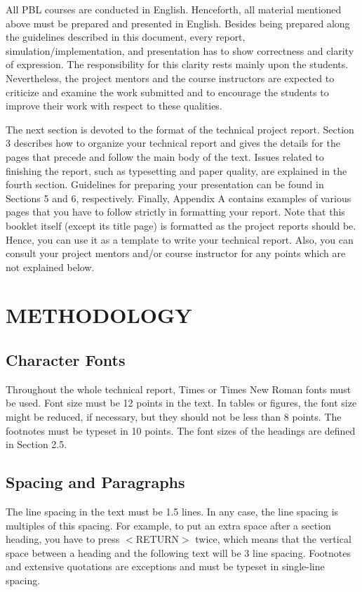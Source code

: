 \documentclass[12pt]{article} %
\numberwithin{equation}{section}
\numberwithin{figure}{section}
\numberwithin{table}{section}
\numberwithin{algorithm}{section}
\begin{document}
All PBL courses are conducted in English. Henceforth, all material mentioned above must be prepared and presented in English. Besides being prepared along the guidelines described in this document, every report, simulation/implementation, and presentation has to show correctness and clarity of expression. The responsibility for this clarity rests mainly upon the students. Nevertheless, the project mentors and the course instructors are expected to criticize and examine the work submitted and to encourage the students to improve their work with respect to these qualities.

The next section is devoted to the format of the technical project report. Section 3 describes how to organize your technical report and gives the details for the pages that precede and follow the main body of the text. Issues related to finishing the report, such as typesetting and paper quality, are explained in the fourth section. Guidelines for preparing your presentation can be found in Sections 5 and 6, respectively. Finally, Appendix A contains examples of various pages that you have to follow strictly in formatting your report. Note that this booklet itself (except its title page) is formatted as the project reports should be. Hence, you can use it as a template to write your technical report. Also, you can consult your project mentors and/or course instructor for any points which are not explained below.

\section{METHODOLOGY}

\subsection{Character Fonts}

Throughout the whole technical report, Times or Times New Roman fonts must be used. Font size must be 12 points in the text. In tables or figures, the font size might be reduced, if necessary, but they should not be less than 8 points. The footnotes must be typeset in 10 points. The font sizes of the headings are defined in Section 2.5.

\subsection{Spacing and Paragraphs}

The line spacing in the text must be 1.5 lines. In any case, the line spacing is multiples of this spacing. For example, to put an extra space after a section heading, you have to press $<$RETURN$>$ twice, which means that the vertical space between a heading and the following text will be 3 line spacing. Footnotes and extensive quotations are exceptions and must be typeset in single-line spacing.
\end{document}
